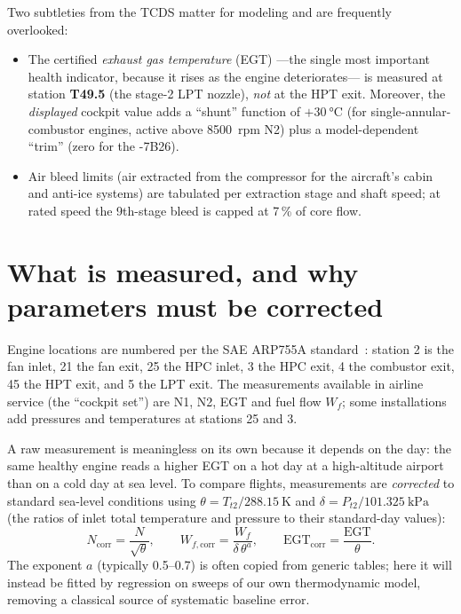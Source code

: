 Two subtleties from the TCDS matter for modeling and are frequently overlooked:
\begin{itemize}
  \item The certified \emph{exhaust gas temperature} (EGT) ---the single most important health
    indicator, because it rises as the engine deteriorates--- is measured at station
    \textbf{T49.5} (the stage-2 LPT nozzle), \emph{not} at the HPT exit. Moreover, the
    \emph{displayed} cockpit value adds a ``shunt'' function of $+\SI{30}{\degreeCelsius}$ (for
    single-annular-combustor engines, active above \SI{8500}{rpm} N2) plus a model-dependent
    ``trim'' (zero for the -7B26).
  \item Air bleed limits (air extracted from the compressor for the aircraft's cabin and
    anti-ice systems) are tabulated per extraction stage and shaft speed; at rated speed the
    9th-stage bleed is capped at 7\,\% of core flow.
\end{itemize}

\section{What is measured, and why parameters must be corrected}
\label{sec:stations}

Engine locations are numbered per the SAE ARP755A standard~\cite{SAE755}: station 2 is the fan
inlet, 21 the fan exit, 25 the HPC inlet, 3 the HPC exit, 4 the combustor exit, 45 the HPT
exit, and 5 the LPT exit. The measurements available in airline service (the ``cockpit set'')
are N1, N2, EGT and fuel flow $W_f$; some installations add pressures and temperatures at
stations 25 and 3.

A raw measurement is meaningless on its own because it depends on the day: the same healthy
engine reads a higher EGT on a hot day at a high-altitude airport than on a cold day at sea
level. To compare flights, measurements are \emph{corrected} to standard sea-level conditions
using $\theta = T_{t2}/\SI{288.15}{\kelvin}$ and $\delta = P_{t2}/\SI{101.325}{\kilo\pascal}$
(the ratios of inlet total temperature and pressure to their standard-day values):
\begin{equation}
  N_{\mathrm{corr}} = \frac{N}{\sqrt{\theta}}, \qquad
  W_{f,\mathrm{corr}} = \frac{W_f}{\delta\,\theta^{a}}, \qquad
  \mathrm{EGT}_{\mathrm{corr}} = \frac{\mathrm{EGT}}{\theta}.
\end{equation}
The exponent $a$ (typically 0.5--0.7) is often copied from generic tables; here it will instead
be fitted by regression on sweeps of our own thermodynamic model, removing a classical source
of systematic baseline error.

